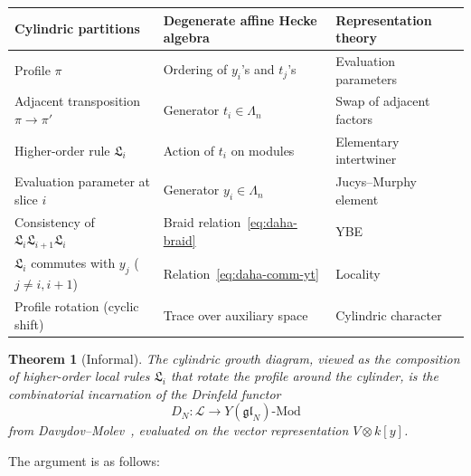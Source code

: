 \documentclass[12pt,a4paper]{article}
\newtheorem{theorem}{Theorem}[section]
\theoremstyle{definition}
\theoremstyle{remark}
\newcommand{\gl}{\mathfrak{gl}}
\newcommand{\fL}{\mathfrak{L}}
\begin{document}
\begin{center}
\renewcommand{\arraystretch}{1.5}
\begin{tabular}{@{}lll@{}}
\toprule
\textbf{Cylindric partitions} & \textbf{Degenerate affine Hecke algebra}
  & \textbf{Representation theory} \\
\midrule
Profile $\pi$ & Ordering of $y_i$'s and $t_j$'s
  & Evaluation parameters \\
Adjacent transposition $\pi \to \pi'$
  & Generator $t_i \in \Lambda_n$
  & Swap of adjacent factors \\
Higher-order rule $\fL_i$
  & Action of $t_i$ on modules
  & Elementary intertwiner \\
Evaluation parameter at slice $i$
  & Generator $y_i \in \Lambda_n$
  & Jucys--Murphy element \\
Consistency of $\fL_i \fL_{i+1} \fL_i$
  & Braid relation~\eqref{eq:daha-braid}
  & YBE \\
$\fL_i$ commutes with $y_j$ ($j \neq i, i{+}1$)
  & Relation~\eqref{eq:daha-comm-yt}
  & Locality \\
Profile rotation (cyclic shift)
  & Trace over auxiliary space
  & Cylindric character \\
\bottomrule
\end{tabular}
\end{center}

\begin{theorem}[Informal]\label{thm:drinfeld}
The cylindric growth diagram, viewed as the composition of
higher-order local rules $\fL_i$ that rotate the profile around the
cylinder, is the combinatorial incarnation of the \emph{Drinfeld
functor}
\[
  D_N : \mathcal{L} \to Y(\gl_N)\text{-}\mathrm{Mod}
\]
from Davydov--Molev~\cite{DM}, evaluated on the vector representation
$V \otimes k[y]$.
\end{theorem}

The argument is as follows:
\end{document}
